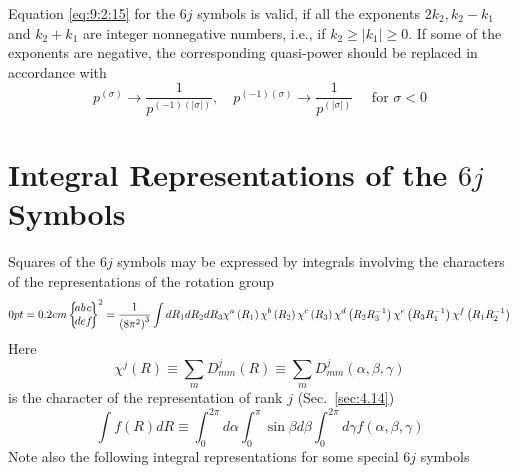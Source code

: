Equation \eqref{eq:9:2:15} for the $6 j$ symbols is valid, if all the exponents $2 k_{2}, k_{2}-k_{1}$ and $k_{2}+k_{1}$ are integer nonnegative numbers, i.e., if $k_{2} \geq\left|k_{1}\right| \geq 0$. If some of the exponents are negative, the corresponding quasi-power should be replaced in accordance with
\begin{equation}
p^{(\sigma)} \rightarrow \frac{1}{p^{(-1)(|\sigma|)}}, \quad p^{(-1)(\sigma)} \rightarrow \frac{1}{p^{(|\sigma|)}} \quad \text { for } \sigma<0 \label{eq:9:2:24}
\end{equation}
\section{Integral Representations of the $6 j$ Symbols}\label{sec:9.3}
Squares of the $6 j$ symbols may be expressed by integrals involving the characters of the representations of the rotation group \cite{ref110}
\begin{equation}
\sixj{a}{b}{c}{d}{e}{f}^{2}  \label{eq:9:3:1}=\frac{1}{\left(8 \pi^{2}\right)^{3}} \int d R_{1} d R_{2} d R_{3} \chi^{a}\left(R_{1}\right) \chi^{b}\left(R_{2}\right) \chi^{c}\left(R_{3}\right) \chi^{d}\left(R_{2} R_{3}^{-1}\right) \chi^{e}\left(R_{3} R_{1}^{-1}\right) \chi^{f}\left(R_{1} R_{2}^{-1}\right)
\end{equation}
Here
\[
\chi^{j}(R) \equiv \sum_{m} D_{m m}^{j}(R) \equiv \sum_{m} D_{m m}^{j}(\alpha, \beta, \gamma)
\]
is the character of the representation of rank $j$ (Sec.~\ref{sec:4.14})
\[
\int f(R) d R \equiv \int_{0}^{2 \pi} d \alpha \int_{0}^{\pi} \sin \beta d \beta \int_{0}^{2 \pi} d \gamma f(\alpha, \beta, \gamma)
\]
Note also the following integral representations for some special $6 j$ symbols
